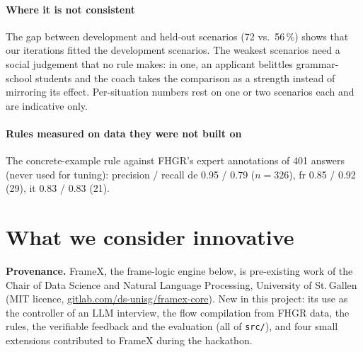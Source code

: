 \documentclass[10pt,a4paper]{article}
\newcommand{\devOpus}{72}        %
\newcommand{\hoOpus}{56}         %
\newcommand{\crit}[2]{\tcbox[on line,colback=#1,colframe=#1,coltext=white,boxsep=0pt,left=3pt,right=3pt,top=1.5pt,bottom=1.5pt,arc=2pt,fontupper=\sffamily\bfseries\scriptsize]{#2}}
\newcommand{\inno}{\crit{rust}{Innovation 25\,\%}}
\begin{document}
\paragraph{Where it is not consistent} \spread{} The gap between development and held-out scenarios (\devOpus{} vs.\ \hoOpus\,\%) shows that our
iterations fitted the development scenarios. The weakest scenarios need a social judgement that no rule makes: in one, an
applicant belittles grammar-school students and the coach takes the comparison as a strength instead of mirroring its effect.
Per-situation numbers rest on one or two scenarios each and are indicative only.

\paragraph{Rules measured on data they were not built on} The concrete-example rule against FHGR's expert annotations of 401 answers
(never used for tuning): precision / recall de 0.95 / 0.79 ($n=326$), fr 0.85 / 0.92 (29), it 0.83 / 0.83 (21).

\section{What we consider innovative}\label{sec:inno}
\inno{}\quad
\textbf{Provenance.} FrameX, the frame-logic engine below, is pre-existing work of the Chair of Data Science and Natural Language
Processing, University of St.\,Gallen (MIT licence, \href{https://gitlab.com/ds-unisg/framex-core}{gitlab.com/ds-unisg/framex-core}).
New in this project: its use as the controller of an LLM interview, the flow compilation from FHGR data, the rules,
the verifiable feedback and the evaluation (all of \texttt{src/}), and four small extensions contributed to FrameX during the hackathon.
\end{document}
